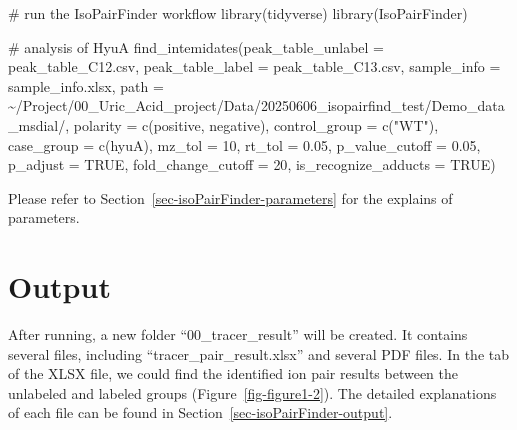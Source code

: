 \documentclass[
  letterpaper,
  DIV=11,
  numbers=noendperiod]{scrreprt}
\newenvironment{Shaded}{\begin{snugshade}}{\end{snugshade}}
\newcommand{\AttributeTok}[1]{\textcolor[rgb]{0.40,0.45,0.13}{#1}}
\newcommand{\CommentTok}[1]{\textcolor[rgb]{0.37,0.37,0.37}{#1}}
\newcommand{\ConstantTok}[1]{\textcolor[rgb]{0.56,0.35,0.01}{#1}}
\newcommand{\DecValTok}[1]{\textcolor[rgb]{0.68,0.00,0.00}{#1}}
\newcommand{\FloatTok}[1]{\textcolor[rgb]{0.68,0.00,0.00}{#1}}
\newcommand{\FunctionTok}[1]{\textcolor[rgb]{0.28,0.35,0.67}{#1}}
\newcommand{\NormalTok}[1]{\textcolor[rgb]{0.00,0.23,0.31}{#1}}
\newcommand{\StringTok}[1]{\textcolor[rgb]{0.13,0.47,0.30}{#1}}
\begin{document}
\begin{Shaded}
\begin{Highlighting}[]
\CommentTok{\# run the IsoPairFinder workflow}
\FunctionTok{library}\NormalTok{(tidyverse)}
\FunctionTok{library}\NormalTok{(IsoPairFinder)}

\CommentTok{\# analysis of HyuA }
\FunctionTok{find\_intemidates}\NormalTok{(}\AttributeTok{peak\_table\_unlabel =} \StringTok{\textquotesingle{}peak\_table\_C12.csv\textquotesingle{}}\NormalTok{,}
                 \AttributeTok{peak\_table\_label =} \StringTok{\textquotesingle{}peak\_table\_C13.csv\textquotesingle{}}\NormalTok{,}
                 \AttributeTok{sample\_info =} \StringTok{\textquotesingle{}sample\_info.xlsx\textquotesingle{}}\NormalTok{,}
                 \AttributeTok{path =} \StringTok{\textquotesingle{}\textasciitilde{}/Project/00\_Uric\_Acid\_project/Data/20250606\_isopairfind\_test/Demo\_data\_msdial/\textquotesingle{}}\NormalTok{,}
                 \AttributeTok{polarity =} \FunctionTok{c}\NormalTok{(}\StringTok{\textquotesingle{}positive\textquotesingle{}}\NormalTok{, }\StringTok{\textquotesingle{}negative\textquotesingle{}}\NormalTok{),}
                 \AttributeTok{control\_group =} \FunctionTok{c}\NormalTok{(}\StringTok{"WT"}\NormalTok{),}
                 \AttributeTok{case\_group =} \FunctionTok{c}\NormalTok{(}\StringTok{\textquotesingle{}hyuA\textquotesingle{}}\NormalTok{),}
                 \AttributeTok{mz\_tol =} \DecValTok{10}\NormalTok{,}
                 \AttributeTok{rt\_tol =} \FloatTok{0.05}\NormalTok{,}
                 \AttributeTok{p\_value\_cutoff =} \FloatTok{0.05}\NormalTok{,}
                 \AttributeTok{p\_adjust =} \ConstantTok{TRUE}\NormalTok{,}
                 \AttributeTok{fold\_change\_cutoff =} \DecValTok{20}\NormalTok{,}
                 \AttributeTok{is\_recognize\_adducts =} \ConstantTok{TRUE}\NormalTok{)}
\end{Highlighting}
\end{Shaded}

Please refer to Section~\ref{sec-isoPairFinder-parameters} for the
explains of parameters.

\section{Output}\label{output}

After running, a new folder ``00\_tracer\_result'' will be created. It
contains several files, including ``tracer\_pair\_result.xlsx'' and
several PDF files. In the tab of the XLSX file, we could find the
identified ion pair results between the unlabeled and labeled groups
(Figure~\ref{fig-figure1-2}). The detailed explanations of each file can
be found in Section~\ref{sec-isoPairFinder-output}.
\end{document}
